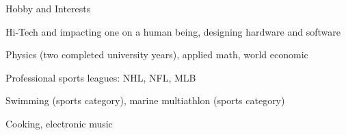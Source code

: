 \documentclass{template}
\begin{document}

\begin{rSection}{Hobby and Interests}

\begin{rHobby}
\item Hi-Tech and impacting one on a human being, designing hardware and software
\item Physics (two completed university years), applied math, world economic
\item Professional sports leagues: NHL, NFL, MLB
\item Swimming (sports category), marine multiathlon (sports category)
\item Cooking, electronic music
\end{rHobby}

\end{rSection}

\end{document}

